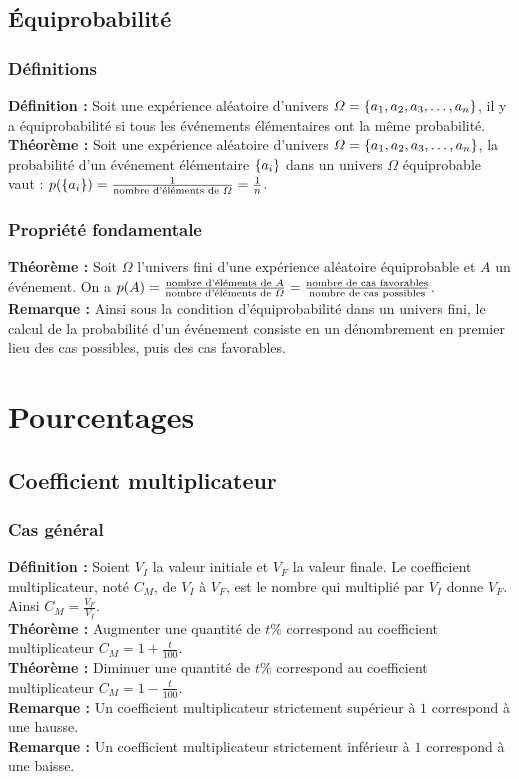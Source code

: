\documentclass[a4paper,titlepage]{article}
\let\oldsection\section
\renewcommand\section{\clearpage\oldsection}
\let\oldleft\left
\renewcommand{\left}{\mathopen{}\mathclose\bgroup\oldleft}
\let\oldright\right
\renewcommand{\right}{\aftergroup\egroup\oldright}
\begin{document}
    \subsection{Équiprobabilité}
        \subsubsection{Définitions}
            \textbf{Définition :} Soit une expérience aléatoire d’univers $\varOmega=\left\{a_{1},a_{2},a_{3},\ldots,a_{n}\right\}$, il y a équiprobabilité si tous les événements élémentaires ont la même probabilité.
            \\
            \textbf{Théorème :} Soit une expérience aléatoire d’univers $\varOmega=\left\{a_{1},a_{2},a_{3},\ldots,a_{n}\right\}$, la probabilité d’un événement élémentaire $\left\{a_{i}\right\}$ dans un univers $\varOmega$ équiprobable vaut : $p\left(\left\{a_{i}\right\}\right)=\frac{1}{\text{nombre d'éléments de }\varOmega}=\frac{1}{n}$.
        \subsubsection{Propriété fondamentale}
            \textbf{Théorème :} Soit $\varOmega$ l’univers fini d’une expérience aléatoire équiprobable et $A$ un événement. On a $p\left(A\right)=\frac{\text{nombre d'éléments de }A}{\text{nombre d'éléments de }\varOmega}=\frac{\text{nombre de cas favorables}}{\text{nombre de cas possibles}}$.
            \\
            \textbf{Remarque :} Ainsi sous la condition d’équiprobabilité dans un univers fini, le calcul de la probabilité d’un événement consiste en un dénombrement en premier lieu des cas possibles, puis des cas favorables.
\section{Pourcentages}
    \subsection{Coefficient multiplicateur}
        \subsubsection{Cas général}
            \textbf{Définition :} Soient $V_{I}$ la valeur initiale et $V_{F}$ la valeur finale. Le coefficient multiplicateur, noté $C_{M}$, de $V_{I}$ à $V_{F}$, est le nombre qui multiplié par $V_{I}$ donne $V_{F}$. Ainsi $C_{M}=\frac{V_{F}}{V_{I}}$.
            \\
            \textbf{Théorème :} Augmenter une quantité de $t\%$ correspond au coefficient multiplicateur $C_{M}=1+\frac{t}{100}$.
            \\
            \textbf{Théorème :} Diminuer une quantité de $t\%$ correspond au coefficient multiplicateur $C_{M}=1-\frac{t}{100}$.
            \\
            \textbf{Remarque :} Un coefficient multiplicateur strictement supérieur à $1$ correspond à une hausse.
            \\
            \textbf{Remarque :} Un coefficient multiplicateur strictement inférieur à $1$ correspond à une baisse.
\end{document}
